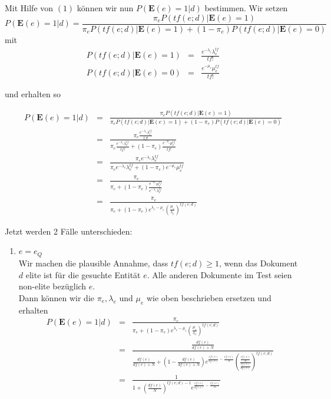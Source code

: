 Mit Hilfe von $(1)$ können wir nun $P(\textbf{E}(e)=1|d)$ bestimmen. Wir setzen
\[ P(\textbf{E}(e)=1|d) = \frac{\pi_e P(tf(e;d)|\textbf{E}(e)=1)}{\pi_e P(tf(e;d)|\textbf{E}(e)=1) + (1-\pi_e) P(tf(e;d)|\textbf{E}(e)=0)} \]
mit
\begin{eqnarray*}
	P(tf(e;d)|\textbf{E}(e)=1) &=& \frac{e^{-\lambda_e}\lambda_e^{tf}}{tf!}\\
	P(tf(e;d)|\textbf{E}(e)=0) &=& \frac{e^{-\mu_e}\mu_e^{tf}}{tf!}
\end{eqnarray*}

und erhalten so

\begin{eqnarray*}
	P(\textbf{E}(e)=1|d) 	&=& 	\frac{\pi_e P(tf(e;d)|\textbf{E}(e)=1)}{\pi_e P(tf(e;d)|\textbf{E}(e)=1) + (1-\pi_e) P(tf(e;d)|\textbf{E}(e)=0)} \\
	&=&	\frac{\pi_e \frac{e^{-\lambda_e}\lambda_e^{tf}}{tf!}}{\pi_e \frac{e^{-\lambda_e}\lambda_e^{tf}}{tf!} + (1 - \pi_e) \frac{e^{-\mu_e}\mu_e^{tf}}{tf!}}\\
	&=&	\frac{\pi_e{e^{-\lambda_e}\lambda_e^{tf}}}{\pi_e {e^{-\lambda_e}\lambda_e^{tf}} + (1 - \pi_e) e^{-\mu_e}\mu_e^{tf}}\\
	&=&	\frac{\pi_e}{\pi_e + (1-\pi_e)\frac{e^{-\mu_e}\mu_e^{tf}}{e^{-\lambda_e}\lambda_e^{tf}}}\\
	&=&	\frac{\pi_e}{\pi_e + (1-\pi_e)e^{\lambda_e - \mu_e}\left( \frac{\mu_e}{\lambda_e}\right)^{tf(e;d)}}	
\end{eqnarray*}

Jetzt werden 2 Fälle unterschieden:
\begin{enumerate}
	\item $e=e_Q$ \\
		Wir machen die plausible Annahme, dass $tf(e;d) \geq 1$, wenn das Dokument $d$ elite ist für die gesuchte Entität $e$. Alle anderen Dokumente im Test seien non-elite bezüglich $e$. \\
		Dann können wir die $\pi_e, \lambda_e \text{ und } \mu_e$ wie oben beschrieben ersetzen und erhalten
		\begin{eqnarray*}
			P(\textbf{E}(e)=1|d)	&=&	\frac{\pi_e}{\pi_e + (1-\pi_e)e^{\lambda_e - \mu_e}\left( \frac{\mu_e}{\lambda_e}\right)^{tf(e;d)}}\\
			&=&	\frac{\frac{df(e)}{df(e) + N}}{\frac{df(e)}{df(e) + N} + \left(1-\frac{df(e)}{df(e) + N}\right) e^{\frac{cf(e)}{df(e)}-\frac{cf(e)}{N}} \left( \frac{\frac{cf(e)}{N}}{\frac{cf(e)}{df(e)}}\right)^{tf(e;d)}}\\
			&=&	\frac{1}{1+ \left( \frac{df(e)}{N}\right)^{tf(e;d)-1}e^{\frac{cf(e)}{df(e)}-\frac{cf(e)}{N}}}
		\end{eqnarray*}
\end{enumerate}

